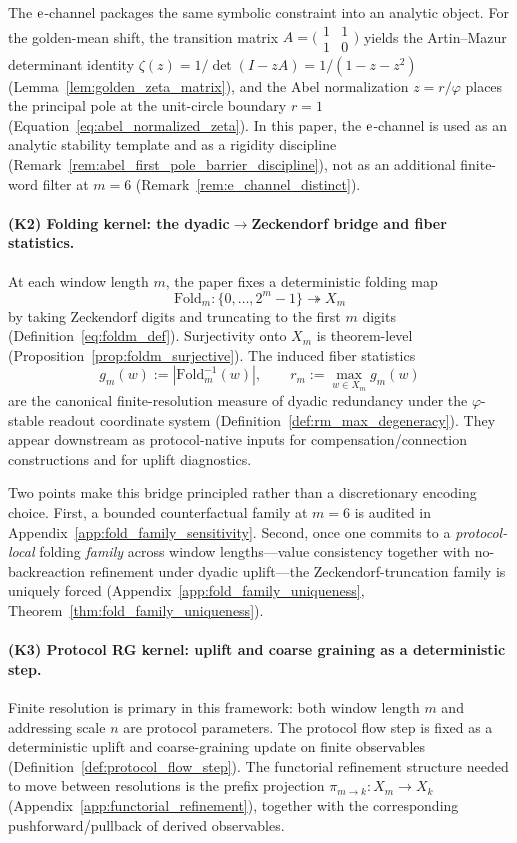 The $\mathrm{e}$-channel packages the same symbolic constraint into an analytic object.
For the golden-mean shift, the transition matrix
$A=\bigl(\begin{smallmatrix}1&1\\[2pt]1&0\end{smallmatrix}\bigr)$ yields the Artin--Mazur determinant identity
$\zeta(z)=1/\det(I-zA)=1/(1-z-z^2)$ (Lemma~\ref{lem:golden_zeta_matrix}),
and the Abel normalization $z=r/\varphi$ places the principal pole at the unit-circle boundary $r=1$ (Equation~\eqref{eq:abel_normalized_zeta}).
In this paper, the $\mathrm{e}$-channel is used as an analytic stability template and as a rigidity discipline (Remark~\ref{rem:abel_first_pole_barrier_discipline}), not as an additional finite-word filter at $m=6$ (Remark~\ref{rem:e_channel_distinct}).

\paragraph{(K2) Folding kernel: the dyadic$\to$Zeckendorf bridge and fiber statistics.}
At each window length $m$, the paper fixes a deterministic folding map
\[
\mathrm{Fold}_m:\{0,\dots,2^m-1\}\twoheadrightarrow X_m
\]
by taking Zeckendorf digits and truncating to the first $m$ digits (Definition~\eqref{eq:foldm_def}).
Surjectivity onto $X_m$ is theorem-level (Proposition~\ref{prop:foldm_surjective}).
The induced fiber statistics
\[
g_m(w):=\left|\mathrm{Fold}_m^{-1}(w)\right|,
\qquad
r_m:=\max_{w\in X_m} g_m(w)
\]
are the canonical finite-resolution measure of dyadic redundancy under the $\varphi$-stable readout coordinate system (Definition~\ref{def:rm_max_degeneracy}).
They appear downstream as protocol-native inputs for compensation/connection constructions and for uplift diagnostics.

Two points make this bridge principled rather than a discretionary encoding choice.
First, a bounded counterfactual family at $m=6$ is audited in Appendix~\ref{app:fold_family_sensitivity}.
Second, once one commits to a \emph{protocol-local} folding \emph{family} across window lengths---value consistency together with no-backreaction refinement under dyadic uplift---the Zeckendorf-truncation family is uniquely forced (Appendix~\ref{app:fold_family_uniqueness}, Theorem~\ref{thm:fold_family_uniqueness}).

\paragraph{(K3) Protocol RG kernel: uplift and coarse graining as a deterministic step.}
Finite resolution is primary in this framework: both window length $m$ and addressing scale $n$ are protocol parameters.
The protocol flow step is fixed as a deterministic uplift and coarse-graining update on finite observables (Definition~\ref{def:protocol_flow_step}).
The functorial refinement structure needed to move between resolutions is the prefix projection
$\pi_{m\to k}:X_m\to X_k$ (Appendix~\ref{app:functorial_refinement}), together with the corresponding pushforward/pullback of derived observables.

